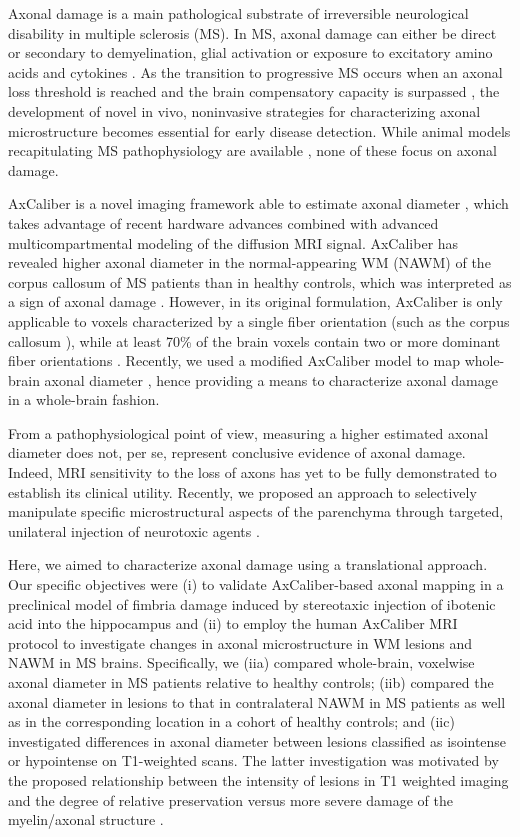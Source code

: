 \documentclass[11pt]{article}
\begin{document}
Axonal damage is a main pathological substrate of irreversible neurological disability in multiple sclerosis (MS). In MS, axonal damage can either be direct or secondary to demyelination, glial activation or exposure to excitatory amino acids and cytokines \cite{Haines2011}. As the transition to progressive MS occurs when an axonal loss threshold is reached and the brain compensatory capacity is surpassed \cite{Criste2014}, the development of novel in vivo, noninvasive strategies for characterizing axonal microstructure becomes essential for early disease detection. While animal models recapitulating MS pathophysiology are available \cite{Torkildsen2008,Constantinescu2011}, none of these focus on axonal damage.

AxCaliber is a novel imaging framework able to estimate axonal diameter \cite{Assaf2008}, which takes advantage of recent hardware advances \cite{Jones2018} combined with advanced multicompartmental modeling of the diffusion MRI signal. AxCaliber has revealed higher axonal diameter in the normal-appearing WM (NAWM) of the corpus callosum of MS patients than in healthy controls, which was interpreted as a sign of axonal damage \cite{Huang2016}. However, in its original formulation, AxCaliber is only applicable to voxels characterized by a single fiber orientation (such as the corpus callosum \cite{Huang2016}), while at least 70\% of the brain voxels contain two or more dominant fiber orientations \cite{Jeurissen2013}. Recently, we used a modified AxCaliber model to map whole-brain axonal diameter \cite{DeSantis2019b}, hence providing a means to characterize axonal damage in a whole-brain fashion.

From a pathophysiological point of view, measuring a higher estimated axonal diameter does not, per se, represent conclusive evidence of axonal damage. Indeed, MRI sensitivity to the loss of axons has yet to be fully demonstrated to establish its clinical utility. Recently, we proposed an approach to selectively manipulate specific microstructural aspects of the parenchyma through targeted, unilateral injection of neurotoxic agents \cite{GarciaHernandez2022}.

Here, we aimed to characterize axonal damage using a translational approach. Our specific objectives were (i) to validate AxCaliber-based axonal mapping in a preclinical model of fimbria damage induced by stereotaxic injection of ibotenic acid into the hippocampus and (ii) to employ the human AxCaliber MRI protocol to investigate changes in axonal microstructure in WM lesions and NAWM in MS brains. Specifically, we (iia) compared whole-brain, voxelwise axonal diameter in MS patients relative to healthy controls; (iib) compared the axonal diameter in lesions to that in contralateral NAWM in MS patients as well as in the corresponding location in a cohort of healthy controls; and (iic) investigated differences in axonal diameter between lesions classified as isointense or hypointense on T1-weighted scans. The latter investigation was motivated by the proposed relationship between the intensity of lesions in T1 weighted imaging and the degree of relative preservation versus more severe damage of the myelin/axonal structure \cite{Loevner1995}.
\end{document}
